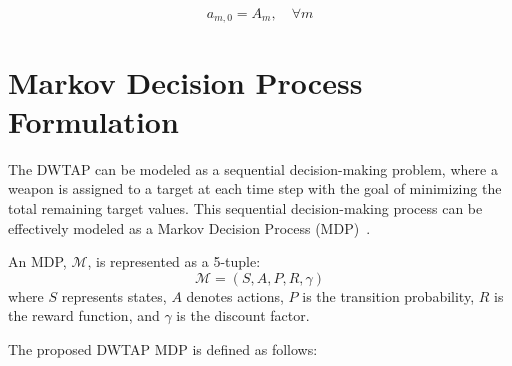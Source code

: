 \begin{equation}\label{eq:initial_ammunition}
    a_{m,0} = A_m, \quad \forall m
\end{equation}

\section{Markov Decision Process Formulation}
\label{sec:mdp}

The DWTAP can be modeled as a sequential decision-making problem, where a weapon is assigned to a target at each time step with the goal of minimizing the total remaining target values. This sequential decision-making process can be effectively modeled as a Markov Decision Process (MDP)~\cite{bellman1957dynamic}.

An MDP, $\mathcal{M}$, is represented as a 5-tuple:
\begin{equation}
\mathcal{M} = (S, A, P, R, \gamma)
\end{equation}
where $S$ represents states, $A$ denotes actions, $P$ is the transition probability, $R$ is the reward function, and $\gamma$ is the discount factor.

The proposed DWTAP MDP is defined as follows:


